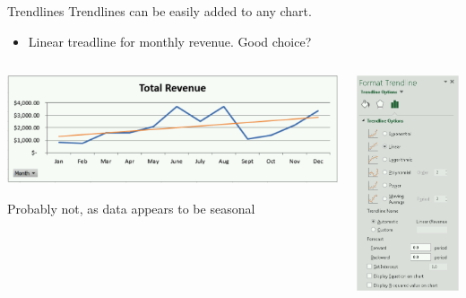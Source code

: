 \documentclass[xcolor=svgnames, handout]{beamer}
\begin{document}
\begin{frame}{Trendlines}
Trendlines can be easily added to any chart.
\begin{itemize}
\item Linear treadline for monthly revenue.  Good choice?
\end{itemize}
\begin{columns}[T] %
\begin{column}{.48\textwidth}
\vspace{5mm}
 \begin{center}
 \hspace*{6mm}                                                           
    \includegraphics[width=1.3\textwidth]{Trendlines1}
 \end{center}
  \begin{alertblock}{}
Probably not, as data appears to be seasonal  \end{alertblock}
\end{column}%
\hfill%
\begin{column}{.48\textwidth}
\vspace{-5mm}
 \begin{center}
        \includegraphics[height=.7\textheight]{Trendlines2}

\end{center}
\end{column}
\end{columns}
\end{frame}
\end{document}
